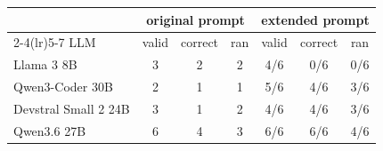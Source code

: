 \begin{tabular}{@{}lcccccc@{}}\toprule
& \multicolumn{3}{c}{original prompt} & \multicolumn{3}{c}{extended prompt} \\ \cmidrule(lr){2-4}\cmidrule(lr){5-7}
LLM & valid & correct & ran & valid & correct & ran \\ \midrule
Llama 3 8B & 3 & 2 & 2 & 4/6 & 0/6 & 0/6 \\
Qwen3-Coder 30B & 2 & 1 & 1 & 5/6 & 4/6 & 3/6 \\
Devstral Small 2 24B & 3 & 1 & 2 & 4/6 & 4/6 & 3/6 \\
Qwen3.6 27B & 6 & 4 & 3 & 6/6 & 6/6 & 4/6 \\
\bottomrule\end{tabular}
